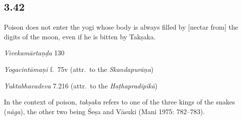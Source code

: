 \begin{ekdosis}

\subsection*{3.42}
\begin{translation}[hp03_042]
Poison does not enter the yogi whose body is always filled by [nectar from] the digits of the moon, even if he is bitten by Takṣaka.
\end{translation}

\begin{sources}[hp03_042]
\emph{Vivekamārtaṇḍa} 130
\begin{versinnote}
\tl{\var{pīḍayet ] pīḍyate, sarpati, bādhyate \vl}\\!}
\end{versinnote}
\end{sources}

\begin{testimonia}[hp03_042]
\emph{Yogacintāmaṇi} f.~75v (attr.~to the \emph{Skandapurāṇa})
\begin{versinnote}
\end{versinnote}

\emph{Yuktabhavadeva} 7.216 (attr.~to the \emph{Haṭhapradīpikā})
\begin{versinnote}
\end{versinnote}
\end{testimonia}

\begin{philcomm}[hp03_042]
In the context of poison, \emph{takṣaka} refers to one of the three kings of the snakes (\emph{nāga}), the other two being Śeṣa and Vāsuki (Mani 1975: 782–783). %


\end{philcomm}
\end{ekdosis}
